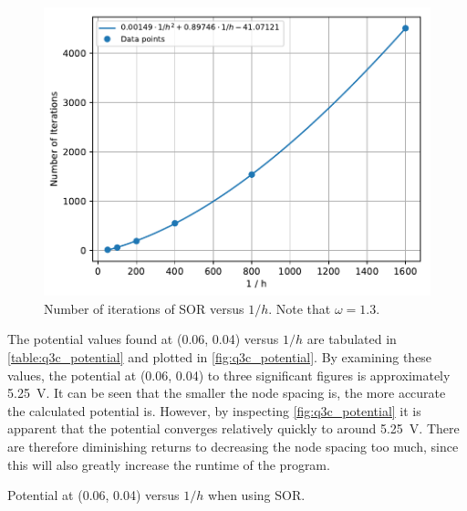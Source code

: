 \documentclass[a4paper,titlepage]{article}
\begin{document}
	\begin{figure}[!htb]
		\centering
		\includegraphics[width=\columnwidth]{plots/q3c_iterations.pdf}
		\caption
		{Number of iterations of SOR versus $1/h$. Note that $\omega=1.3$.}
		\label{fig:q3c_iterations}
	\end{figure}

	The potential values found at (0.06, 0.04) versus $1/h$ are tabulated in \autoref{table:q3c_potential} and plotted in \autoref{fig:q3c_potential}. By examining these values, the potential at (0.06, 0.04) to three significant figures is approximately \SI{5.25}{\volt}. It can be seen that the smaller the node spacing is, the more accurate the calculated potential is. However, by inspecting \autoref{fig:q3c_potential} it is apparent that the potential converges relatively quickly to around \SI{5.25}{\volt}. There are therefore diminishing returns to decreasing the node spacing too much, since this will also greatly increase the runtime of the program.

	\begin{table}[!htb]
		\centering
		\caption{Potential at (0.06, 0.04) versus $1/h$ when using SOR.}
		\label{table:q3c_potential}
	\end{table}
\end{document}
